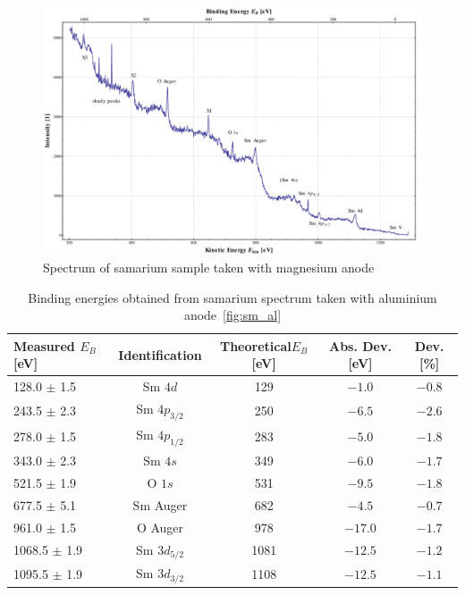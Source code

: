 \documentclass[a4paper,10pt]{scrartcl}
\begin{document}
\begin{figure}
\centering
\includegraphics[scale=0.3]{img/samarium_binding_mg}
\caption{Spectrum of samarium sample taken with magnesium anode \label{fig:sm_mg}}
\end{figure}


\begin{table}
\begin{center}
\begin{tabular}{lcccc}
\toprule
Measured $E_{B}$ [eV]      & Identification & Theoretical$E_{B}$ [eV] & Abs. Dev. [eV] & Dev. [\%]\\
\midrule
\phantom{0}128.0 $\pm$ 1.5 & Sm $4d$        & 129                     & $-1.0$         & $-0.8$\\
\phantom{0}243.5 $\pm$ 2.3 & Sm $4p_{3/2}$  & 250                     & $-6.5$         & $-2.6$\\
\phantom{0}278.0 $\pm$ 1.5 & Sm $4p_{1/2}$  & 283                     & $-5.0$         & $-1.8$\\
\phantom{0}343.0 $\pm$ 2.3 & Sm $4s$        & 349                     & $-6.0$         & $-1.7$\\
\phantom{0}521.5 $\pm$ 1.9 & O $1s$         & 531                     & $-9.5$         & $-1.8$\\
\phantom{0}677.5 $\pm$ 5.1 & Sm Auger       & 682                     & $-4.5$         & $-0.7$\\
\phantom{0}961.0 $\pm$ 1.5 & O Auger        & 978                     & $-17.0$        & $-1.7$\\
1068.5 $\pm$ 1.9           & Sm $3d_{5/2}$  & 1081                    & $-12.5$        & $-1.2$\\
1095.5 $\pm$ 1.9           & Sm $3d_{3/2}$  & 1108                    & $-12.5$        & $-1.1$\\
\bottomrule
\end{tabular}
\end{center}
\par
\caption{Binding energies obtained from samarium spectrum taken with aluminium anode~\ref{fig:sm_al} \label{tab:sm_al_ident}}
\end{table}
\end{document}

